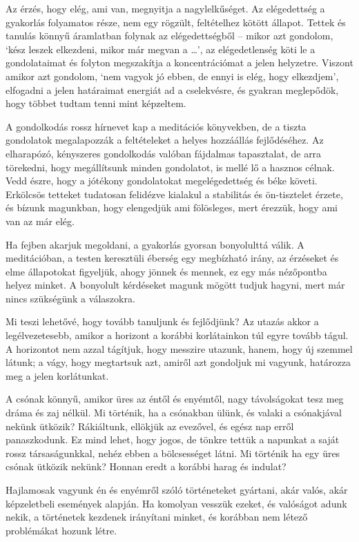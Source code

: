 Az érzés, hogy elég, ami van, megnyitja a nagylelkűséget. Az
elégedettség a gyakorlás folyamatos része, nem egy rögzült, feltételhez
kötött állapot. Tettek és tanulás könnyű áramlatban folynak az
elégedettségből -- mikor azt gondolom, `kész leszek elkezdeni, mikor már
megvan a \ldots{}', az elégedetlenség köti le a gondolataimat és folyton
megszakítja a koncentrációmat a jelen helyzetre. Viszont amikor azt
gondolom, `nem vagyok jó ebben, de ennyi is elég, hogy elkezdjem',
elfogadni a jelen határaimat energiát ad a cselekvésre, és gyakran
meglepődök, hogy többet tudtam tenni mint képzeltem.

A gondolkodás rossz hírnevet kap a meditációs könyvekben, de a tiszta
gondolatok megalapozzák a feltételeket a helyes hozzáállás fejlődéséhez.
Az elharapózó, kényszeres gondolkodás valóban fájdalmas tapasztalat, de
arra törekedni, hogy megállítsunk minden gondolatot, is mellé lő a
hasznos célnak. Vedd észre, hogy a jótékony gondolatokat megelégedettség
és béke követi. Erkölcsös tetteket tudatosan felidézve kialakul a
stabilitás és ön-tisztelet érzete, és bízunk magunkban, hogy elengedjük
ami fölösleges, mert érezzük, hogy ami van az már elég.

Ha fejben akarjuk megoldani, a gyakorlás gyorsan bonyolulttá válik. A
meditációban, a testen keresztüli éberség egy megbízható irány, az
érzéseket és elme állapotokat figyeljük, ahogy jönnek és mennek, ez egy
más nézőpontba helyez minket. A bonyolult kérdéseket magunk mögött
tudjuk hagyni, mert már nincs szükségünk a válaszokra.

Mi teszi lehetővé, hogy tovább tanuljunk és fejlődjünk? Az utazás akkor
a legélvezetesebb, amikor a horizont a korábbi korlátainkon túl egyre
tovább tágul. A horizontot nem azzal tágítjuk, hogy messzire utazunk,
hanem, hogy új szemmel látunk; a vágy, hogy megtartsuk azt, amiről azt
gondoljuk mi vagyunk, határozza meg a jelen korlátunkat.

A csónak könnyű, amikor üres az éntől és enyémtől, nagy távolságokat
tesz meg dráma és zaj nélkül. Mi történik, ha a csónakban ülünk, és
valaki a csónakjával nekünk ütközik? Rákiáltunk, ellökjük az evezővel,
és egész nap erről panaszkodunk. Ez mind lehet, hogy jogos, de tönkre
tettük a napunkat a saját rossz társaságunkkal, nehéz ebben a
bölcsességet látni. Mi történik ha egy üres csónak ütközik nekünk?
Honnan eredt a korábbi harag és indulat?

Hajlamosak vagyunk én és enyémről szóló történeteket gyártani, akár
valós, akár képzeletbeli események alapján. Ha komolyan vesszük ezeket,
és valóságot adunk nekik, a történetek kezdenek irányítani minket, és
korábban nem létező problémákat hozunk létre.


